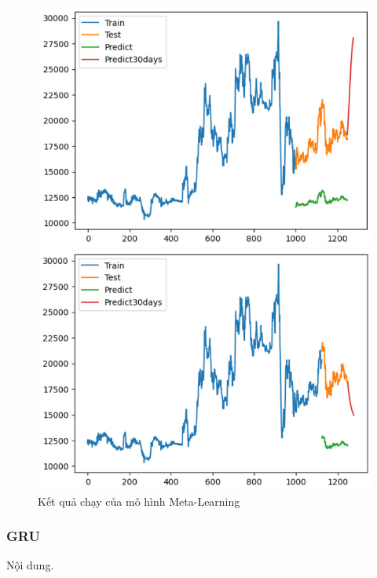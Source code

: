 \begin{figure}[H]
\begin{minipage}{0.15\textwidth}
    \includegraphics[width=1\textwidth]{resources/chapter-5/result/EXB_LSTM_8_2.jpg}
    \end{minipage}
    \hfill
        \begin{minipage}{0.15\textwidth}
    \centering
    \includegraphics[width=1\textwidth]{resources/chapter-5/result/EXB_LSTM_9_1.jpg}
    \end{minipage}
    \hfill
    
    \caption{Kết quả chạy của mô hình Meta-Learning}
    \label{fig:lstm_result}
\end{figure}

\subsubsection{GRU}
Nội dung.


